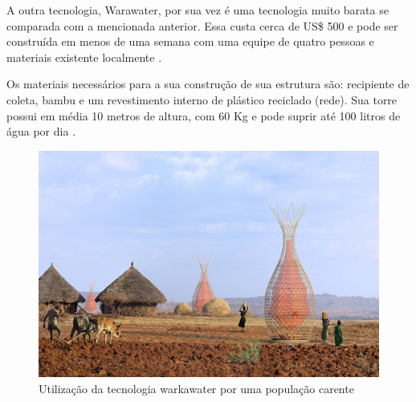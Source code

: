 A outra tecnologia, Warawater, por sua vez é uma tecnologia muito barata se comparada com a mencionada anterior. 
Essa custa cerca de US\$ 500 e pode ser construída em menos de uma semana com uma equipe de quatro pessoas e materiais 
existente localmente \cite{warkawater}.

Os materiais necessários para a sua construção de sua estrutura são: recipiente de coleta, bambu e um revestimento
interno de plástico reciclado (rede). Sua torre possui em média 10 metros de altura, com 60 Kg e pode suprir até 100 litros
de água por dia \cite{warkawater2}.

\begin{figure}[!htbp]
\centering
\includegraphics[scale=0.3]{editaveis/figuras/warkawater}
\caption[Utilização da tecnologia warkawater por uma população carente]
{Utilização da tecnologia warkawater por uma população carente  \footnotemark}
\FloatBarrier
\label{Especificacoes}
\end{figure}

% 
% 

% 